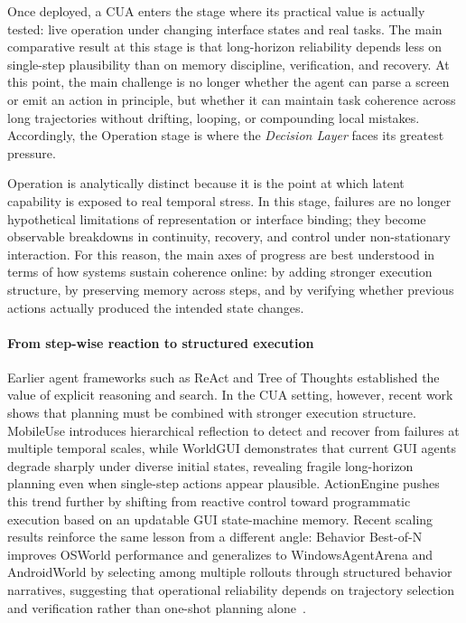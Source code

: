 Once deployed, a CUA enters the stage where its practical value is actually tested: live operation under changing interface states and real tasks. The main comparative result at this stage is that long-horizon reliability depends less on single-step plausibility than on memory discipline, verification, and recovery. At this point, the main challenge is no longer whether the agent can parse a screen or emit an action in principle, but whether it can maintain task coherence across long trajectories without drifting, looping, or compounding local mistakes. Accordingly, the Operation stage is where the \emph{Decision Layer} faces its greatest pressure.

Operation is analytically distinct because it is the point at which latent capability is exposed to real temporal stress. In this stage, failures are no longer hypothetical limitations of representation or interface binding; they become observable breakdowns in continuity, recovery, and control under non-stationary interaction. For this reason, the main axes of progress are best understood in terms of how systems sustain coherence online: by adding stronger execution structure, by preserving memory across steps, and by verifying whether previous actions actually produced the intended state changes.

\paragraph{From step-wise reaction to structured execution}
Earlier agent frameworks such as ReAct \cite{yao2022react} and Tree of Thoughts \cite{yao2023tree} established the value of explicit reasoning and search. In the CUA setting, however, recent work shows that planning must be combined with stronger execution structure. MobileUse \cite{li2025mobileuse} introduces hierarchical reflection to detect and recover from failures at multiple temporal scales, while WorldGUI \cite{zhao2025worldgui} demonstrates that current GUI agents degrade sharply under diverse initial states, revealing fragile long-horizon planning even when single-step actions appear plausible. ActionEngine \cite{zhong2026actionengine} pushes this trend further by shifting from reactive control toward programmatic execution based on an updatable GUI state-machine memory. Recent scaling results reinforce the same lesson from a different angle: Behavior Best-of-N improves OSWorld performance and generalizes to WindowsAgentArena and AndroidWorld by selecting among multiple rollouts through structured behavior narratives, suggesting that operational reliability depends on trajectory selection and verification rather than one-shot planning alone~\cite{gonzalez2025scalingcua}.

